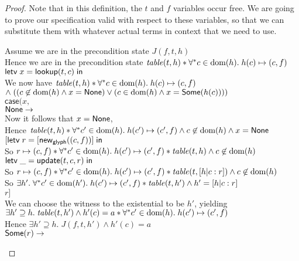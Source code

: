\begin{proof}
Note that in this definition, the $t$ and $f$ variables occur free. We are going to 
prove our specification valid with respect to these variables, so that we can substitute
them with whatever actual terms in context that we need to use. 

\begin{tabbedproof}
\oo Assume we are in the precondition state $J(f, t, h)$ \\
\oo Hence we are in the precondition state $\mathit{table}(t, h) * \forall^{*}c \in \mbox{dom}({h}).\;h(c) \mapsto (c,f)$ \\
\oo $\mathsf{letv}\;x = \mathsf{lookup}(t,c)\;\mathsf{in}\;$ \\
\oo We now have $\mathit{table}(t, h) * \forall^{*}c \in \mbox{dom}({h}).\;h(c) \mapsto (c,f)$  \\
\ox $\land\; ((c \not \in \mbox{dom}({h}) \land x = \mathsf{None}) \vee (c \in \mbox{dom}({h}) \land x = \mathsf{Some}(h(c))))$ \\
\oo $\mathsf{case}(x,$ \\
\ooo $\mathsf{None} \to$ \\
\oooo Now it follows that $x = \mathsf{None}$, \\
\oooo Hence $\mathit{table}(t, h) * \forall^{*}c' \in \mbox{dom}({h}).\;h(c') \mapsto (c',f) \land c \not \in \mbox{dom}({h}) \land x = \mathsf{None}$\\
\oooo $[\mathsf{letv}\;r = [\mathsf{new}_{\mathsf{glyph}}((c,f))]\;\mathsf{in}\;$ \\
\oooo So $r \mapsto (c,f) * \forall^{*}c' \in \mbox{dom}({h}).\;h(c') \mapsto (c',f) * \mathit{table}(t, h) \land c \not \in \mbox{dom}({h})$\\
\oooo $\mathsf{letv}\;\_ = \mathsf{update}(t, c, r)\;\mathsf{in}\;$ \\
\oooo So $r \mapsto (c,f) * \forall^{*}c' \in \mbox{dom}({h}).\;h(c') \mapsto (c',f) * \mathit{table}(t, [h|c:r]) \land c \not \in \mbox{dom}({h})$\\
\oooo So $\exists h'.\; \forall^{*}c' \in \mbox{dom}({h'}).\;h(c') \mapsto (c',f) * \mathit{table}(t, h') \land h' = [h|c:r]$\\
\oooo $r]$ \\
\oooo We can choose the witness to the existential to be $h'$, yielding \\
\ooox $\exists h' \supseteq h.\; \mathit{table}(t, h') \land h'(c) = a * \forall^{*}c' \in \mbox{dom}({h}).\;h(c') \mapsto (c',f)$ \\
\oooo Hence $\exists h' \supseteq h.\; J(f, t, h') \land h'(c) = a$ \\
\ooo $\mathsf{Some}(r) \to $ \\

\end{tabbedproof}
\end{proof}
